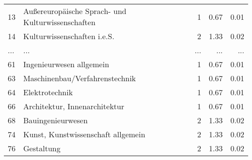 \begin{longtable}{lXrrr}
        13 & \multicolumn{1}{X}{Außereuropäische Sprach- und Kulturwissenschaften} & %
          \num{1} &
          \num[round-mode=places,round-precision=2]{0.67} &
          \num[round-mode=places,round-precision=2]{0.01} \\
        14 & \multicolumn{1}{X}{Kulturwissenschaften i.e.S.} & %
          \num{2} &
          \num[round-mode=places,round-precision=2]{1.33} &
          \num[round-mode=places,round-precision=2]{0.02} \\
       ... & ... & ... & ... & ... \\
        61 & \multicolumn{1}{X}{Ingenieurwesen allgemein} & %
          \num{1} &
          \num[round-mode=places,round-precision=2]{0.67} &
          \num[round-mode=places,round-precision=2]{0.01} \\

        63 & \multicolumn{1}{X}{Maschinenbau/Verfahrenstechnik} & %
          \num{1} &
          \num[round-mode=places,round-precision=2]{0.67} &
          \num[round-mode=places,round-precision=2]{0.01} \\

        64 & \multicolumn{1}{X}{Elektrotechnik} & %
          \num{1} &
          \num[round-mode=places,round-precision=2]{0.67} &
          \num[round-mode=places,round-precision=2]{0.01} \\

        66 & \multicolumn{1}{X}{Architektur, Innenarchitektur} & %
          \num{1} &
          \num[round-mode=places,round-precision=2]{0.67} &
          \num[round-mode=places,round-precision=2]{0.01} \\

        68 & \multicolumn{1}{X}{Bauingenieurwesen} & %
          \num{2} &
          \num[round-mode=places,round-precision=2]{1.33} &
          \num[round-mode=places,round-precision=2]{0.02} \\

        74 & \multicolumn{1}{X}{Kunst, Kunstwissenschaft allgemein} & %
          \num{2} &
          \num[round-mode=places,round-precision=2]{1.33} &
          \num[round-mode=places,round-precision=2]{0.02} \\

        76 & \multicolumn{1}{X}{Gestaltung} & %
          \num{2} &
          \num[round-mode=places,round-precision=2]{1.33} &
          \num[round-mode=places,round-precision=2]{0.02} \\


\end{longtable}
